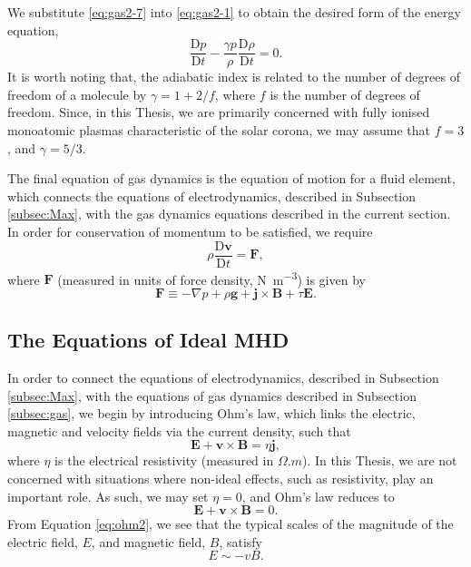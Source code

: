 %
We substitute \eqref{eq:gas2-7} into \eqref{eq:gas2-1} to obtain the desired form of the energy equation,
%
\begin{equation}
\label{eq:energy}
\frac{\mathrm{D} p}{\mathrm{D} t} - \frac{\gamma p}{\rho} \frac{\mathrm{D} \rho}{\mathrm{D} t} = 0.
\end{equation}
%
It is worth noting that, the adiabatic index is related to the number of degrees of freedom of a molecule by $\gamma = 1 + 2/f$, where $f$ is the number of degrees of freedom.
Since, in this Thesis, we are primarily concerned with fully ionised monoatomic plasmas characteristic of the solar corona, we may assume that $f = 3$, and $\gamma = 5/3$.

The final equation of gas dynamics is the equation of motion for a fluid element, which connects the equations of electrodynamics, described in Subsection \ref{subsec:Max}, with the gas dynamics equations described in the current section.
In order for conservation of momentum to be satisfied, we require
%
\begin{equation}
\label{eq:gas3}
\rho \frac{\mathrm{D} \mathbf v}{\mathrm{D} t} = \mathbf{F},
\end{equation}
%
where $\mathbf{F}$ (measured in units of force density, \si{N.m^{-3}}) is given by
%
\begin{equation}
\label{eq:gas3-1}
\mathbf{F} \equiv - \nabla p + \rho \mathbf{g} + \mathbf{j} \times \mathbf{B} + \tau \mathbf{E}.
\end{equation}
%

\subsection{The Equations of Ideal MHD}
\label{subsec:mhdderiv}

In order to connect the equations of electrodynamics, described in Subsection \ref{subsec:Max}, with the equations of gas dynamics described in Subsection \ref{subsec:gas}, we begin by introducing Ohm's law, which links the electric, magnetic and velocity fields via the current density, such that
%
\begin{equation}
\label{eq:ohm1}
\mathbf{E} + \mathbf{v} \times \mathbf{B} = \eta \mathbf{j},
\end{equation}
%
where $\eta$ is the electrical resistivity (measured in $\si{\Omega.m}$).
In this Thesis, we are not concerned with situations where non-ideal effects, such as resistivity, play an important role.
As such, we may set $\eta = 0$, and Ohm's law reduces to
%
\begin{equation}
\label{eq:ohm2}
\mathbf{E} + \mathbf{v} \times \mathbf{B} = 0.
\end{equation}
%
From Equation \eqref{eq:ohm2}, we see that the typical scales of the magnitude of the electric field, $E$, and magnetic field, $B$, satisfy
%
\begin{equation}
\label{eq:scales1}
E \sim - v B.
\end{equation}
%

